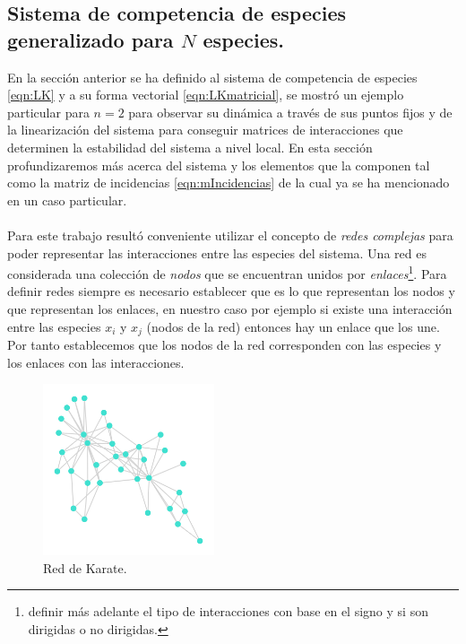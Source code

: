 \documentclass[11pt,a4paper]{article}
\begin{document}
\subsection{Sistema de competencia de especies generalizado para $N$ especies.}

En la sección anterior se ha definido al sistema de competencia de especies \ref{eqn:LK} y a su forma vectorial \ref{eqn:LKmatricial}, se mostró un ejemplo particular para $n=2$ para observar su dinámica a través de sus puntos fijos y de la linearización del sistema para conseguir matrices de interacciones que determinen la estabilidad del sistema a nivel local. En esta sección profundizaremos más acerca del sistema y los elementos que la componen tal como la matriz de incidencias \ref{eqn:mIncidencias} de la cual ya se ha mencionado en un caso particular. \\
\\
Para este trabajo resultó conveniente utilizar el concepto de \textit{redes complejas} para poder representar las interacciones entre las especies del sistema. Una red es considerada una colección de \textit{nodos} que se encuentran unidos por \textit{enlaces}\footnote{definir más adelante el tipo de interacciones con base en el signo y si son dirigidas o no dirigidas.}. Para definir redes siempre es necesario establecer que es lo que representan los nodos y que representan los enlaces, en nuestro caso por ejemplo si existe una interacción entre las especies $x_i$ y $x_j$ (nodos de la red) entonces hay un enlace que los une. Por tanto establecemos que los nodos de la red corresponden con las especies y los enlaces con las interacciones.
\begin{figure} \vspace{-30pt} \begin{center}
		\includegraphics[width=0.45\textwidth]{../Imagenes/karate} 
	\end{center} 
	\vspace{-20pt} 
	\caption{Red de Karate.} 
	\vspace{-10pt}
	\label{fig:RedKarate}
\end{figure} 
\end{document}
